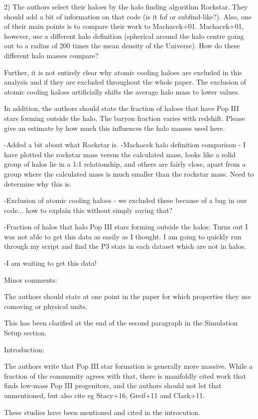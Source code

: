 \documentclass[11pt]{article}
\newenvironment{referee}[1][]{%
    \ignorespaces%
    \begin{mdframed}[style=myquotestyle,#1]%
}{%
    \end{mdframed}%
    \ignorespacesafterend%
}%
\begin{document}
\begin{referee}
2) The authors select their haloes by the halo finding algorithm Rockstar. They should add a bit of information on that code (is it fof or subfind-like?). Also, one of their main points is to compare their work to Machacek+01. Machacek+01, however, use a different halo definition (spherical around the halo centre going out to a radius of 200 times the mean density of the Universe). How do these different halo masses compare?

Further, it is not entirely clear why atomic cooling haloes are excluded in this analysis and if they are excluded throughout the whole paper. The exclusion of atomic cooling haloes artificially shifts the average halo mass to lower values.

In addition, the authors should state the fraction of haloes that have Pop III stars forming outside the halo. The baryon fraction varies with redshift. Please give an estimate by how much this influences the halo masses used here.
\end{referee}

-Added a bit about what Rockstar is. 
-Machacek halo definition comparison - I have plotted the rockstar mass versus the calculated mass, looks like a solid group of halos lie in a 1:1 relationship, and others are fairly close, apart from a group where the calculated mass is much smaller than the rockstar mass. Need to determine why this is.

-Exclusion of atomic cooling haloes - we excluded these because of a bug in our code... how to explain this without simply saying that?

-Fraction of halos that halo Pop III stars forming outside the halos: Turns out I was not able to get this data as easily as I thought. I am going to quickly run through my script and find the P3 stars in each dataset which are not in halos.

-I am waiting to get this data!

\begin{referee}
Minor comments:

The authors should state at one point in the paper for which properties they use comoving or physical units.
\end{referee}
This has been clarified at the end of the second paragraph in the Simulation Setup section.

\begin{referee}
Introduction:

The authors write that Pop III star formation is generally more massive. While a fraction of the community agrees with that, there is manifoldly cited work that finds low-mass Pop III progenitors, and the authors should not let that unmentioned, but also cite eg Stacy+16, Greif+11 and Clark+11.
\end{referee}
These studies have been mentioned and cited in the introcution.
\end{document}
